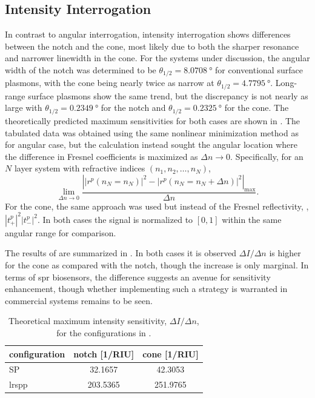 \subsection{Intensity Interrogation}

In contrast to angular interrogation, intensity interrogation shows
differences between the notch and the cone, most likely due to both the
sharper resonance and narrower linewidth in the cone.  For the systems under
discussion, the angular width of the notch was determined to be
$\theta_{1/2}=\SI{8.0708}{\degree}$ for conventional surface plasmons, with
the cone being nearly twice as narrow at $\theta_{1/2}=\SI{4.7795}{\degree}$.
Long-range surface plasmons show the same trend, but the discrepancy is not
nearly as large with $\theta_{1/2}=\SI{0.2349}{\degree}$ for the notch and
$\theta_{1/2}=\SI{0.2325}{\degree}$ for the cone.  The theoretically predicted
maximum sensitivities for both cases are shown in .
The tabulated data was obtained using the same nonlinear minimization method
as for angular case, but the calculation instead sought the angular location where the
difference in Fresnel coefficients is maximized as $\Delta n \to 0$.
Specifically, for an $N$ layer system with refractive indices $(n_1,n_2,
  \ldots,n_N)$,
\begin{equation}
  \lim_{\Delta n \to 0}\frac{\left||r^p(n_N=n_N)|^2 - |r^p(n_N=n_N + \Delta
    n)|^2\right|_\mathrm{max}}{\Delta n}.
  \label{eqn:fresnelsenspertrubation}
\end{equation}
For the cone, the same approach was used but instead of the Fresnel
reflectivity, , $|t^p_+|^2|t^p_-|^2$.  In
both cases the signal is normalized to $[0,1]$ within the same angular range
for comparison.

The results of are summarized in
.  In both cases it is observed $\Delta I/\Delta
  n$ is higher for the cone as compared with the notch, though the increase
is only marginal.  In terms of \gls{spr} biosensors, the difference suggests an
avenue for sensitivity enhancement, though whether implementing such a
strategy is warranted in commercial systems remains to be seen.
\begin{table}[ht]
  \centering
  \begin{tabular}{lSS}
    \toprule
    {configuration} & {notch [1/RIU]} & {cone [1/RIU]} \\
    \midrule
    SP              & 32.1657         & 42.3053        \\
    \gls{lrspp}     & 203.5365        & 251.9765       \\
    \bottomrule
  \end{tabular}
  \caption{Theoretical maximum intensity sensitivity, $\Delta I/\Delta n$,
    for the configurations in . }
  \label{tbl:intensitysens}
\end{table}

